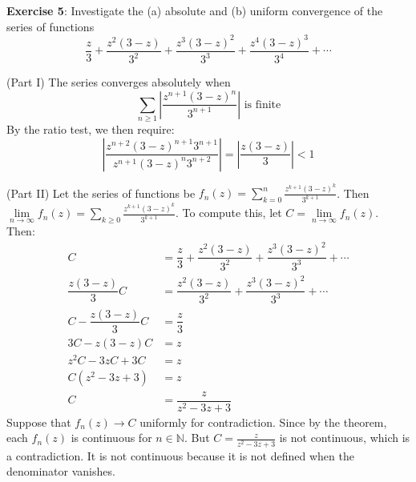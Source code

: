 \documentclass{article}
\begin{document}
\newpage

\textbf{Exercise 5}: Investigate the (a) absolute and (b) uniform convergence of the series of functions
    \begin{equation*}
        \dfrac{z}{3} + \dfrac{z^{2}(3 - z)}{3^{2}} + \dfrac{z^{3}(3 - z)^{2}}{3^{3}} + \dfrac{z^{4}(3 - z)^{3}}{3^{4}} + \cdots
    \end{equation*}
    \begin{answer}
        (Part I) The series converges absolutely when 
            \begin{equation*}
                \sum_{n \geq 1}\left\lvert \dfrac{z^{n + 1}(3 - z)^{n}}{3^{n + 1}} \right\rvert \text{ is finite}
            \end{equation*}
        By the ratio test, we then require:
            \begin{equation*}
                \left\lvert \dfrac{z^{n + 2}(3 - z)^{n + 1}3^{n + 1}}{z^{n + 1}(3 - z)^{n}3^{n + 2}} \right\rvert = \left\lvert \dfrac{z(3 - z)}{3} \right\rvert < 1
            \end{equation*}

        (Part II) Let the series of functions be $f_{n}(z) = \sum_{k = 0}^{n} \frac{z^{k + 1}(3 - z)^{k}}{3^{k + 1}}$. Then $\lim\limits_{n \to \infty} f_{n}(z) = \sum_{k \geq 0}\frac{z^{k + 1}(3 - z)^{k}}{3^{k + 1}}$. To compute this, let $C = \lim\limits_{n \to \infty}f_{n}(z)$. Then:
            \begin{align*}
                C                        &= \dfrac{z}{3} + \dfrac{z^{2}(3 - z)}{3^{2}} + \dfrac{z^{3}(3 - z)^{2}}{3^{3}} + \cdots \\
                \dfrac{z(3 - z)}{3}C     &= \dfrac{z^{2}(3 - z)}{3^{2}} + \dfrac{z^{3}(3 - z)^{2}}{3^{3}} + \cdots                \\
                C - \dfrac{z(3 - z)}{3}C &= \dfrac{z}{3}                                                                          \\
                3C - z(3 - z)C           &= z                                                                                     \\
                z^{2}C - 3zC + 3C        &= z                                                                                     \\
                C(z^{2} - 3z + 3)        &= z                                                                                     \\
                C                        &= \dfrac{z}{z^{2} - 3z + 3}                                                               
            \end{align*}
        Suppose that $f_{n}(z) \rightarrow C$ uniformly for contradiction. Since by the theorem, each $f_{n}(z)$ is continuous for $n \in \mathbb{N}$. But $C = \frac{z}{z^{2} - 3z + 3}$ is not continuous, which is a contradiction. It is not continuous because it is not defined when the denominator vanishes.
    \end{answer}
\end{document}
